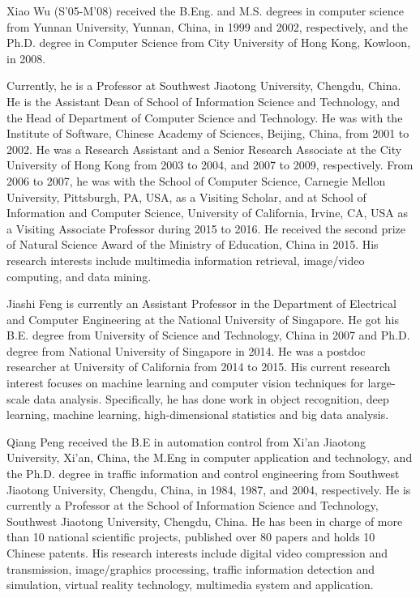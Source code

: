 \documentclass[journal]{IEEEtran}
\begin{document}
\begin{IEEEbiography}{Xiao Wu}
	(S'05-M'08) received the B.Eng. and M.S. degrees in computer science from Yunnan University, Yunnan, China, in 1999 and 2002, respectively, and the Ph.D. degree in Computer Science from City University of Hong Kong, Kowloon, in 2008.

  Currently, he is a Professor at Southwest Jiaotong University, Chengdu, China. He is the Assistant Dean of School of Information Science and Technology, and the Head of Department of Computer Science and Technology. He was with the Institute of Software, Chinese Academy of Sciences, Beijing, China, from 2001 to 2002. He was a Research Assistant and a Senior Research Associate at the City University of Hong Kong from 2003 to 2004, and 2007 to 2009, respectively. From 2006 to 2007, he was with the School of Computer Science, Carnegie Mellon University, Pittsburgh, PA, USA, as a Visiting Scholar, and at School of Information and Computer Science, University of California, Irvine, CA, USA as a Visiting Associate Professor during 2015 to 2016. He received the second prize of Natural Science Award of the Ministry of Education, China in 2015. His research interests include multimedia information retrieval, image/video computing, and data mining.
\end{IEEEbiography}

\begin{IEEEbiography}{Jiashi Feng} is currently an Assistant Professor in the Department of Electrical and Computer Engineering at the National University of Singapore. He got his B.E. degree from University of Science and Technology, China in 2007 and Ph.D. degree from National University of Singapore in 2014. He was a postdoc researcher at University of California from 2014 to 2015. His current research interest focuses on machine learning and computer vision techniques for large-scale data analysis. Specifically, he has done work in object recognition, deep learning, machine learning, high-dimensional statistics and big data analysis.
\end{IEEEbiography}

\begin{IEEEbiography}{Qiang Peng}
	received the B.E in automation control from Xi'an Jiaotong University, Xi'an, China, the M.Eng in computer application and technology, and the Ph.D. degree in traffic information and control engineering from Southwest Jiaotong University, Chengdu, China, in 1984, 1987, and 2004, respectively. He is currently a Professor at the School of Information Science and Technology, Southwest Jiaotong University, Chengdu, China. He has been in charge of more than 10 national scientific projects, published over 80 papers and holds 10 Chinese patents. His research interests include digital video compression and transmission, image/graphics processing, traffic information detection and simulation, virtual reality technology, multimedia system and application.
\end{IEEEbiography}
\end{document}
